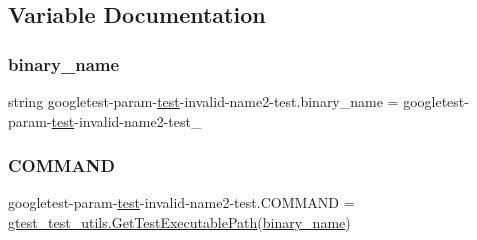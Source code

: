 \subsection{Variable Documentation}
\mbox{\label{namespacegoogletest-param-test-invalid-name2-test_a0e26891aaf72a6f04a60811b05a83e81}} 
\subsubsection{\texorpdfstring{binary\_name}{binary\_name}}
{\footnotesize\ttfamily string googletest-\/param-\/\mbox{\hyperlink{_mutual_8h_a707ee03719e99670bf6cfdfd897b8456}{test}}-\/invalid-\/name2-\/test.\+binary\+\_\+name = \textquotesingle{}googletest-\/param-\/\mbox{\hyperlink{_mutual_8h_a707ee03719e99670bf6cfdfd897b8456}{test}}-\/invalid-\/name2-\/test\+\_\+\textquotesingle{}}

\mbox{\label{namespacegoogletest-param-test-invalid-name2-test_ac9395338e8bff8c30835e578658394e3}} 
\subsubsection{\texorpdfstring{COMMAND}{COMMAND}}
{\footnotesize\ttfamily googletest-\/param-\/\mbox{\hyperlink{_mutual_8h_a707ee03719e99670bf6cfdfd897b8456}{test}}-\/invalid-\/name2-\/test.\+C\+O\+M\+M\+A\+ND = \mbox{\hyperlink{namespacegtest__test__utils_a89ed3717984a80ffbb7a9c92f71b86a2}{gtest\+\_\+test\+\_\+utils.\+Get\+Test\+Executable\+Path}}(\mbox{\hyperlink{namespacegoogletest-param-test-invalid-name2-test_a0e26891aaf72a6f04a60811b05a83e81}{binary\+\_\+name}})}

